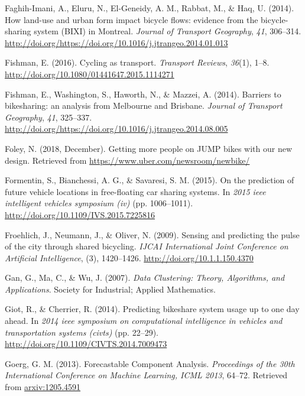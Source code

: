 \documentclass[12pt,oneside]{reedthesis}
\begin{document}
\hypertarget{ref-faghih2014}{}
Faghih-Imani, A., Eluru, N., El-Geneidy, A. M., Rabbat, M., \& Haq, U.
(2014). How land-use and urban form impact bicycle flows: evidence from
the bicycle-sharing system (BIXI) in Montreal. \emph{Journal of
Transport Geography}, \emph{41}, 306--314.
\url{http://doi.org/https://doi.org/10.1016/j.jtrangeo.2014.01.013}

\hypertarget{ref-fishman2016}{}
Fishman, E. (2016). Cycling as transport. \emph{Transport Reviews},
\emph{36}(1), 1--8. \url{http://doi.org/10.1080/01441647.2015.1114271}

\hypertarget{ref-fishman2014}{}
Fishman, E., Washington, S., Haworth, N., \& Mazzei, A. (2014). Barriers
to bikesharing: an analysis from Melbourne and Brisbane. \emph{Journal
of Transport Geography}, \emph{41}, 325--337.
\url{http://doi.org/https://doi.org/10.1016/j.jtrangeo.2014.08.005}

\hypertarget{ref-foley2018}{}
Foley, N. (2018, December). Getting more people on JUMP bikes with our
new design. Retrieved from \url{https://www.uber.com/newsroom/newbike/}

\hypertarget{ref-formentin2015}{}
Formentin, S., Bianchessi, A. G., \& Savaresi, S. M. (2015). On the
prediction of future vehicle locations in free-floating car sharing
systems. In \emph{2015 ieee intelligent vehicles symposium (iv)} (pp.
1006--1011). \url{http://doi.org/10.1109/IVS.2015.7225816}

\hypertarget{ref-froehlich2009}{}
Froehlich, J., Neumann, J., \& Oliver, N. (2009). Sensing and predicting
the pulse of the city through shared bicycling. \emph{IJCAI
International Joint Conference on Artificial Intelligence}, (3),
1420--1426. \url{http://doi.org/10.1.1.150.4370}

\hypertarget{ref-gan2007}{}
Gan, G., Ma, C., \& Wu, J. (2007). \emph{Data Clustering: Theory,
Algorithms, and Applications}. Society for Industrial; Applied
Mathematics.

\hypertarget{ref-giot2014}{}
Giot, R., \& Cherrier, R. (2014). Predicting bikeshare system usage up
to one day ahead. In \emph{2014 ieee symposium on computational
intelligence in vehicles and transportation systems (civts)} (pp.
22--29). \url{http://doi.org/10.1109/CIVTS.2014.7009473}

\hypertarget{ref-goerg2013}{}
Goerg, G. M. (2013). Forecastable Component Analysis. \emph{Proceedings
of the 30th International Conference on Machine Learning, ICML 2013},
64--72. Retrieved from \url{arxiv:1205.4591}
\end{document}
